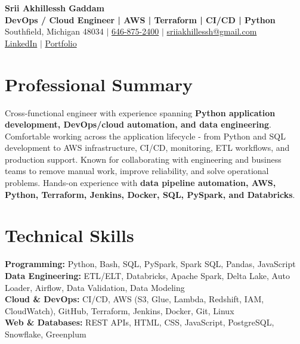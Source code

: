 \documentclass[letterpaper,10pt]{article}
\begin{document}
\fontsize{9.35pt}{10.45pt}\selectfont

\begin{center}
    {\LARGE \textbf{Srii Akhillessh Gaddam}} \\[-1pt]
    \textbf{DevOps / Cloud Engineer | AWS | Terraform | CI/CD | Python} \\[2pt]
    Southfield, Michigan 48034 $|$
    \href{tel:6468752400}{646-875-2400} $|$
    \href{mailto:sriiakhillessh@gmail.com}{sriiakhillessh@gmail.com} \\[1pt]
    \href{https://www.linkedin.com/in/srii-akhiilessh-gaddam-b48668191/}{LinkedIn} $|$
    \href{https://sriiakhillesshg.github.io/portfolio/}{Portfolio}
\end{center}
\vspace{-8pt}

\section{Professional Summary}
\small{Cross-functional engineer with experience spanning \textbf{Python application development, DevOps/cloud automation, and data engineering}. Comfortable working across the application lifecycle - from Python and SQL development to AWS infrastructure, CI/CD, monitoring, ETL workflows, and production support. Known for collaborating with engineering and business teams to remove manual work, improve reliability, and solve operational problems. Hands-on experience with \textbf{data pipeline automation, AWS, Python, Terraform, Jenkins, Docker, SQL, PySpark, and Databricks}.}

\section{Technical Skills}
\small{
\textbf{Programming:} Python, Bash, SQL, PySpark, Spark SQL, Pandas, JavaScript \\
\textbf{Data Engineering:} ETL/ELT, Databricks, Apache Spark, Delta Lake, Auto Loader, Airflow, Data Validation, Data Modeling \\
\textbf{Cloud \& DevOps:} CI/CD, AWS (S3, Glue, Lambda, Redshift, IAM, CloudWatch), GitHub, Terraform, Jenkins, Docker, Git, Linux \\
\textbf{Web \& Databases:} REST APIs, HTML, CSS, JavaScript, PostgreSQL, Snowflake, Greenplum
}
\end{document}
